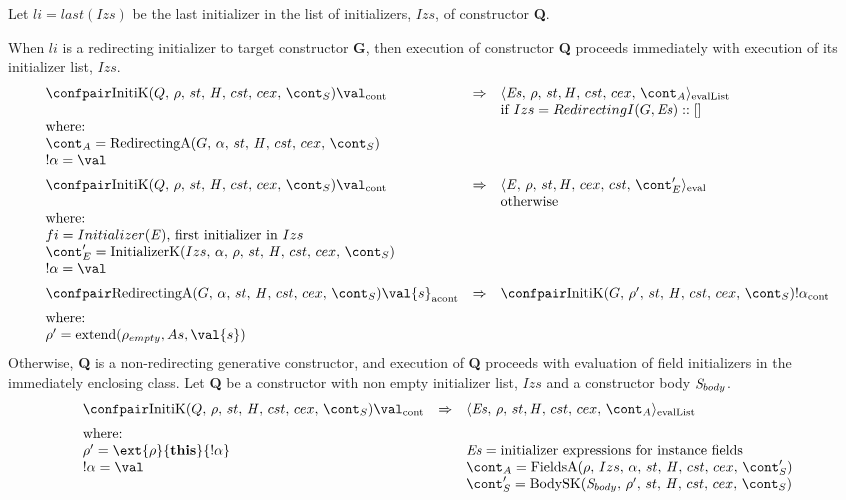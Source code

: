 \documentclass{article}
\DeclareMathOperator{\extend}{extend}
\begin{document}
\noindent
Let $li = last(Izs)$ be the last initializer in the list of initializers, $Izs$, of constructor \textbf{Q}.

\noindent
When $li$ is a redirecting initializer to target constructor \textbf{G}, then execution of constructor \textbf{Q} proceeds immediately with execution of its initializer list, $Izs$.
\[
  \begin{array}{lcl}
	\contconf{\InitK{Q}{\env}{\scont}}{\val}
	& \Rightarrow &
	\evallistconf{\exprs}{\env}{\strace}{\cstrace}{\cex}{\acont}\\
	&&
	\textrm{if } Izs = RedirectingI(G, \exprs) :: []\\
	\textrm{where:}\\
	\acont = \RedirectingA{G}{\loc}{\scont}\\
	\deref{\loc} = \val
	\\[2mm]

	\contconf{\InitK{Q}{\env}{\scont}}{\val}
	& \Rightarrow &
	\evalconf{\expr}{\env}{st}{cex}{cst}{\econt'}\\
	&&
	\textrm{otherwise}\\
	\textrm{where:}\\

	fi = Initializer(\expr) \textrm{, first initializer in }Izs\\
	\econt' = \InitializerK{Izs}{\loc}{\env}{\scont}\\
	\deref{\loc} = \val\\[2mm]

	\acontconf{\RedirectingA{G}{\loc}{\scont}}{\val{s}}
	& \Rightarrow &
	\contconf{\InitK{G}{\env'}{\scont}}{\deref{\loc}}\\[2mm]
	\textrm{where:}\\
	\env' = \extend(\env_{empty}, \formals, \val{s})
  \end{array}
\]
\noindent
Otherwise, \textbf{Q} is a non-redirecting generative constructor, and execution of \textbf{Q} proceeds with evaluation of field initializers in the immediately enclosing class.
\noindent
Let \textbf{Q} be a constructor with non empty initializer list, $Izs$ and a constructor body $\mathit{S}_{body}$.
\[
  \begin{array}{lcl}
	\contconf{\InitK{Q}{\env}{\scont}}{\val}
	& \Rightarrow &
	\evallistconf{\exprs}{\env}{\strace}{\cstrace}{\cex}{\acont}\\[2mm]

	\textrm{where:}\\
	\env' = \ext{\env}{\mathbf{this}}{\deref{\loc}}
	&&
	\exprs = \textrm{initializer expressions for instance fields}\\
	\deref{\loc} = \val
	&&
	\acont = \FieldsA{\env}{Izs}{\loc}{\scont'}\\
	&&
	\scont' = \BodySK{\stmt_{body}}{\env'}{\scont}
  \end{array}
\]
\end{document}
